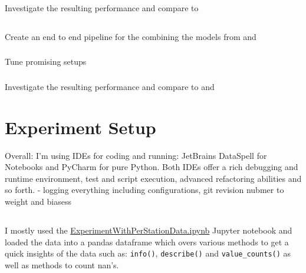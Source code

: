 \documentclass[a4paper]{article}
\begin{document}
    \subsubsection*{} Investigate the resulting performance and compare to 

    \subsection*{}
    \subsubsection*{} Create an end to end pipeline for the combining the models from  and 
    \subsubsection*{} Tune promising setups
    \subsubsection*{} Investigate the resulting performance and compare to  and 



    \section{Experiment Setup}\label{sec:experiment-setup}
    Overall: I'm using IDEs for coding and running: JetBrains DataSpell for Notebooks and PyCharm for pure Python. Both IDEs offer
    a rich debugging and runtime environment, test and script execution, advanced refactoring abilities and so forth.
    - logging everything including configurations, git revision nubmer to weight and biasess

    \subsection*{}

    \subsubsection*{}
    I mostly used the
    \href{https://github.com/isabelladegen/mlp-2021/blob/main/notebooks/ExperimentWithPerStationData.ipynb}{ExperimentWithPerStationData.ipynb}
    Jupyter notebook and loaded the data into a pandas dataframe \cite{reback2020pandas} which overs various methods
    to get a quick insights of the data such as: \texttt{info()}, \texttt{describe()} and \texttt{value\_counts()} as well
    as methods to count nan's.
\end{document}

